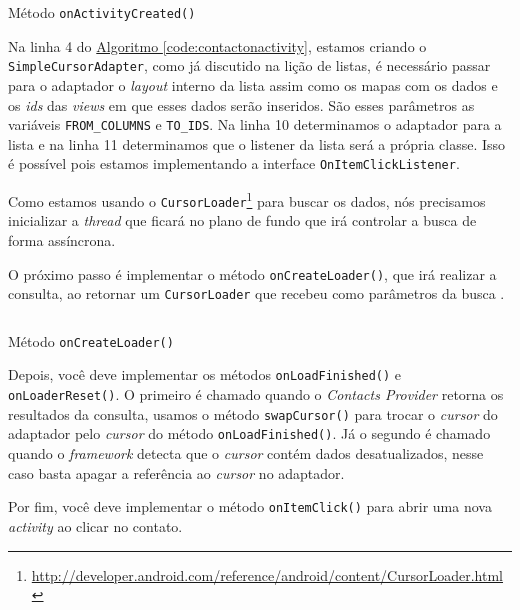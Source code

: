 \documentclass[a4paper,12pt,brazil,oneside]{book}
\begin{document}
		\begin{listing}[H]
		\inputminted[linenos=true,fontsize=\small,frame=lines, framesep=2mm, tabsize=2,numbersep=5pt]{java}{src/api/contacts/onactivity.java}
		\caption{Método \texttt{onActivityCreated()}}
		\label{code:contactonactivity}
		\end{listing} 	

	Na linha 4 do \hyperref[code:contactonactivity]{Algoritmo \ref*{code:contactonactivity}}, estamos criando o \texttt{SimpleCursorAdapter}, como já discutido na lição de listas, é necessário passar para o adaptador o \emph{layout} interno da lista assim como os mapas com os dados e os \emph{ids} das \emph{views} em que esses dados serão inseridos. São esses parâmetros as variáveis \texttt{FROM\_COLUMNS} e \texttt{TO\_IDS}. Na linha 10 determinamos o adaptador para a lista e na linha 11 determinamos que o listener da lista será a própria classe. Isso é possível pois estamos implementando a interface \texttt{OnItemClickListener}.

	Como estamos usando o \texttt{CursorLoader}\footnote{\href{http://developer.android.com/reference/android/content/CursorLoader.html}{http://developer.android.com/reference/android/content/CursorLoader.html}} para buscar os dados, nós precisamos inicializar a \emph{thread} que ficará no plano de fundo que irá controlar a busca de forma assíncrona. 

	O próximo passo é implementar o método \texttt{onCreateLoader()}, que irá realizar a consulta, ao retornar um \texttt{CursorLoader} que recebeu como parâmetros da busca .

		\begin{listing}[H]
		\inputminted[linenos=true,fontsize=\small,frame=lines, framesep=2mm, tabsize=2,numbersep=5pt]{java}{src/api/contacts/oncreateloader.java}
		\caption{Método \texttt{onCreateLoader()}}
		\label{code:contactoncreateloader}
		\end{listing} 	

	Depois, você deve implementar os métodos \texttt{onLoadFinished()} e \texttt{onLoaderReset()}. O primeiro é chamado quando o \emph{Contacts Provider} retorna os resultados da consulta, usamos o método \texttt{swapCursor()} para trocar o \emph{cursor} do adaptador pelo \emph{cursor} do método \texttt{onLoadFinished()}. Já o segundo é chamado quando o \emph{framework} detecta que o \emph{cursor} contém dados desatualizados, nesse caso basta apagar a referência ao \emph{cursor} no adaptador.
	 
	Por fim, você deve implementar o método \texttt{onItemClick()} para abrir uma nova \emph{activity} ao clicar no contato.
\end{document}
